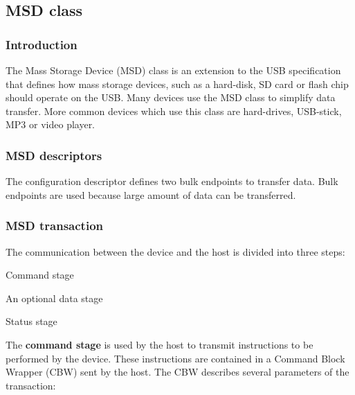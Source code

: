 \documentclass[pdftex,10pt,a4paper]{report}
\newenvironment{packed_item}{
\begin{itemize}
  \setlength{\itemsep}{1pt}
  \setlength{\parskip}{0pt}
  \setlength{\parsep}{0pt}
}{\end{itemize}}
\begin{document}
\subsection{MSD class}
\subsubsection{Introduction}
The Mass Storage Device (MSD) class is an extension to the USB specification that defines
how mass storage devices, such as a hard-disk, SD card or flash chip should operate on the USB.
Many devices use the MSD class to simplify data transfer. More common devices which use this class are hard-drives, USB-stick, MP3 or video player.

\subsubsection{MSD descriptors}
The configuration descriptor defines two bulk endpoints to transfer data. Bulk endpoints are used because large amount of data can be transferred.


\subsubsection{MSD transaction}
The communication between the device and the host is divided into three steps:
\begin{packed_item}
	\item Command stage
	\item An optional data stage
	\item Status stage
\end{packed_item}

The \textbf{command stage} is used by the host to transmit instructions to be performed by the device. These instructions are contained in a Command Block Wrapper (CBW) sent by the host. The CBW describes several parameters of the transaction:
\end{document}
